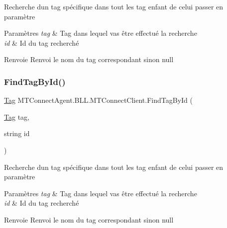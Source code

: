 Recherche d\textquotesingle{}un tag spécifique dans tout les tag enfant de celui passer en paramètre 


\begin{DoxyParams}{Paramètres}
{\em tag} & Tag dans lequel vas être effectué la recherche\\
\hline
{\em id} & Id du tag recherché\\
\hline
\end{DoxyParams}
\begin{DoxyReturn}{Renvoie}
Renvoi le nom du tag correspondant sinon null
\end{DoxyReturn}
\mbox{\label{class_m_t_connect_agent_1_1_b_l_l_1_1_m_t_connect_client_a0deda7ea94d3370139eb1851c1e58bf8}} 
\subsubsection{\texorpdfstring{Find\+Tag\+By\+Id()}{FindTagById()}}
{\footnotesize\ttfamily \mbox{\hyperlink{class_m_t_connect_agent_1_1_model_1_1_tag}{Tag}} M\+T\+Connect\+Agent.\+B\+L\+L.\+M\+T\+Connect\+Client.\+Find\+Tag\+By\+Id (\begin{DoxyParamCaption}\item[{\mbox{\hyperlink{class_m_t_connect_agent_1_1_model_1_1_tag}{Tag}}}]{tag,  }\item[{string}]{id }\end{DoxyParamCaption})\hspace{0.3cm}{\ttfamily [inline]}}



Recherche d\textquotesingle{}un tag spécifique dans tout les tag enfant de celui passer en paramètre 


\begin{DoxyParams}{Paramètres}
{\em tag} & Tag dans lequel vas être effectué la recherche\\
\hline
{\em id} & Id du tag recherché\\
\hline
\end{DoxyParams}
\begin{DoxyReturn}{Renvoie}
Renvoi le nom du tag correspondant sinon null
\end{DoxyReturn}
\mbox{\label{class_m_t_connect_agent_1_1_b_l_l_1_1_m_t_connect_client_adf30641f680b3a6ea91414aedc30c176}} 
